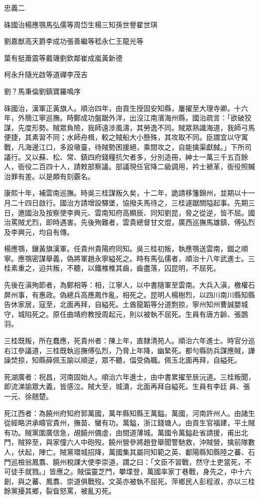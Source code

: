 
\begin{pinyinscope}
忠義二

硃國治楊應鶚馬弘儒等周岱生楊三知孫世譽翟世琪

劉嘉猷高天爵李成功張善繼等嵇永仁王龍光等

葉有挺蕭震等戴璣劉欽鄰崔成嵐黃新德

柯永升隨光啟等道禪李茂吉

劉？馬秉倫劉鎮寶羅鳴序

硃國治，漢軍正黃旗人。順治四年，由貢生授固安知縣，屢擢至大理寺卿。十六年，外簡江寧巡撫。時鄭成功盤踞外洋，出沒江南濱海州縣，國治疏言：「欲破狡謀，先度形勢。賊眾負險，我師遠涉風濤，其勞逸不同。賊眾熟識海道，我師弓馬便捷，其素習不同；水師舟楫，較之賊船大小懸殊，其攻取不同。臣謂宜以守寓戰，凡海邊江口，多設墩臺，待賊勢困援絕，乘間攻之，自能擒渠獻馘。」下所司議行。又以蘇、松、常、鎮四府錢糧抗欠者多，分別造冊，紳士一萬三千五百餘人，衙役二百四十人，請敕部察議。部議現任官降二級調用，衿士褫革，衙役照贓治罪有差。以是頗有刻覈名。

康熙十年，補雲南巡撫。時吳三桂謀叛久矣，十二年，詭請移籓錦州，並期以十一月二十四日啟行。國治方請增設驛堡，協撥夫馬待之，三桂遽踞關隘起事。先期三日，邀國治及按察使李興元、雲南知府高顯辰、同知劉昆，脅之從逆，皆不屈。國治罵賊尤烈，即時遇害。先後殉難者，雲貴總督甘文焜，廣西巡撫馬雄鎮、傅弘烈及李興元，均自有傳。

楊應鶚，鑲黃旗漢軍。任貴州貴陽府同知。吳三桂初叛，執應鶚送雲南，錮之順寧。應鶚密謀舉義，偽將軍趙永寧縊死之。時有馬弘儒者，順治十八年武進士。三桂素重之，迫共叛，不聽，以鐵椎椎其齒，齒盡落，囚昆明，不屈死。

先後在滇殉節者，為鄭相等：相，江寧人，以中書隨軍至雲南。大兵入滇，檄權石屏州事，有惠政。偽總兵高應鳳作亂，相死之。昆明人楊樹烈，以四川南川縣知縣告休家居，寇至，北面再拜，自縊死。土酋龍韜等分道剽掠，寧州知州曹誠嬰城守，城陷死之。原任曲靖府教授周起元，則以被執不屈死。生員有唐方齡、張鵾羽。

三桂既叛，所在蠢應，死貴州者：陳上年，直隸清苑人。順治六年進士。時官分巡右江參議道，三桂既執巡撫傅弘烈，乃脅上年降，幽縶死。都勻縣防兵謀應賊，譁譟焚掠，知縣薛佩玉諭以順逆，眾不聽，偪受偽職。佩玉北面再拜，自縊死。

死湖廣者：祝昌，河南固始人。順治六年進士，由中書累擢至辰沅道。三桂叛聞，即流涕諭眾大義，皆感泣。賊大至，城潰，北面再拜自縊死。生員有李廷員、張一元、徐翹楚。

死江西者：為饒州府知府郭萬國，萬年縣知縣王萬鎰。萬國，河南許州人。由諸生從經略洪承疇官貴州，撫苗、蠻有功。萬鎰，浙江錢塘人。由貢生官福建，平土賊有功。賊黨圍廣信急，覘饒州備虛，由間道薄城。萬國令萬鎰赴省請援，甫出北門，賊猝至，與家僮六人中砲歿。饒州營參將趙登舉聞警馳救，沖賊營，擒前隊數人，伏起，陣亡。賊黨環城招降，萬國集其屬同知範之英、鄱陽縣知縣陸之蕃、石門巡檢翁鳳翥、饒州稅課大使李崇道，謂之曰：「文臣不習戰，然守土吏當死，不可徒手就戮。」皆應之。賊偪靈芝門，攀堞登，萬國率家丁巷戰，身先之，中十六創，與之蕃、鳳翥、崇道俱戰歿。文英亦被執不屈死。萍鄉民人彭程淑，亦以三桂餘黨擾其鄉，裂眥怒罵，被亂刃死。


\end{pinyinscope}
